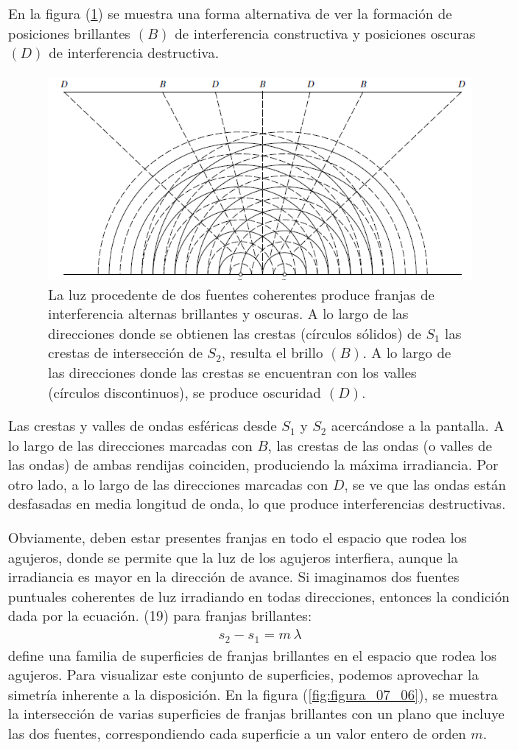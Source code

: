 \documentclass[14pt]{extarticle}
\begin{document}
En la figura (\ref{fig:figura_07_05}) se muestra una forma alternativa de ver la formación de posiciones brillantes $(B)$ de interferencia constructiva y posiciones oscuras $(D)$ de interferencia destructiva.
\begin{figure}[H]
    \centering
    \includegraphics[scale=0.8]{Imagenes/Interferencia2_05.png}
    \caption{La luz procedente de dos fuentes coherentes produce franjas de interferencia alternas brillantes y oscuras. A lo largo de las direcciones donde se obtienen las crestas (círculos sólidos) de $S_{1}$ las crestas de intersección de $S_{2}$, resulta el brillo $(B)$. A lo largo de las direcciones donde las crestas se encuentran con los valles (círculos discontinuos), se produce oscuridad $(D)$.}
    \label{fig:figura_07_05}
\end{figure}
Las crestas y valles de ondas esféricas desde $S_{1}$ y $S_{2}$ acercándose a la pantalla. A lo largo de las direcciones marcadas con $B$, las crestas de las ondas (o valles de las ondas) de ambas rendijas coinciden, produciendo la máxima irradiancia. Por otro lado, a lo largo de las direcciones marcadas con $D$, se ve que las ondas están desfasadas en media longitud de onda, lo que produce interferencias destructivas.
\par
Obviamente, deben estar presentes franjas en todo el espacio que rodea los agujeros, donde se permite que la luz de los agujeros interfiera, aunque la irradiancia es mayor en la dirección de avance. Si imaginamos dos fuentes puntuales coherentes de luz irradiando en todas direcciones, entonces la condición dada por la ecuación. (19) para franjas brillantes:
\begin{align}
s_{2} - s_{1} = m \, \lambda
\label{eq:ecuacion_07_24}
\end{align}
define una familia de superficies de franjas brillantes en el espacio que rodea los agujeros. Para visualizar este conjunto de superficies, podemos aprovechar la simetría inherente a la disposición. En la figura (\ref{fig:figura_07_06}), se muestra la intersección de varias superficies de franjas brillantes con un plano que incluye las dos fuentes, correspondiendo cada superficie a un valor entero de orden $m$.
\end{document}
